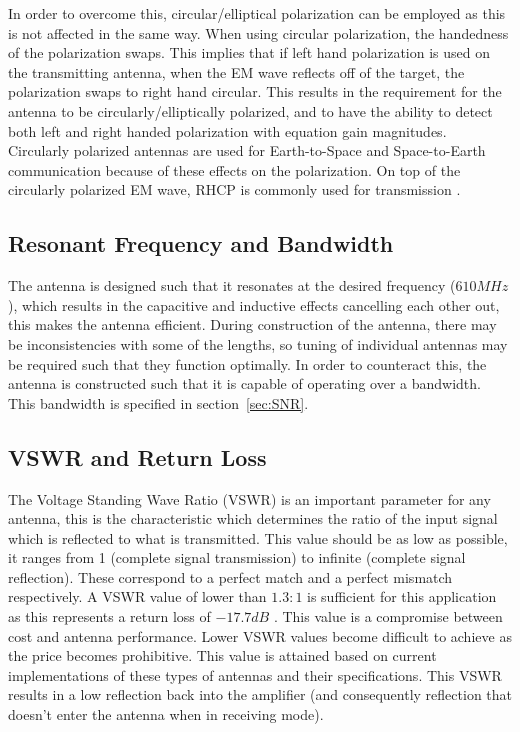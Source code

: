\documentclass[11pt]{witseiepaper}
\begin{document}
In order to overcome this, circular/elliptical polarization can be employed as this is not affected in the same way.
When using circular polarization, the handedness of the polarization swaps. This implies that if left hand polarization is used on the transmitting antenna, when the EM wave reflects off of the target, the polarization swaps to right hand circular.
This results in the requirement for the antenna to be circularly/elliptically polarized, and to have the ability to detect both left and right handed polarization with equation gain magnitudes.
Circularly polarized antennas are used for Earth-to-Space and Space-to-Earth communication because of these effects on the polarization. On top of the circularly polarized EM wave, RHCP is commonly used for transmission \cite[p.~31]{crossedDipoleDesign}.


\subsection{Resonant Frequency and Bandwidth} \label{sec:ResonantFrequencyandBandwidth}
The antenna is designed such that it resonates at the desired frequency ($610 MHz$), which results in the capacitive and inductive effects cancelling each other out, this makes the antenna efficient. During construction of the antenna, there may be inconsistencies with some of the lengths, so tuning of individual antennas may be required such that they function optimally. In order to counteract this, the antenna is constructed such that it is capable of operating over a bandwidth. This bandwidth is specified in section~\ref{sec:SNR}.


\subsection{VSWR and Return Loss} \label{sec:VSRWandReturnLoss}
The Voltage Standing Wave Ratio (VSWR) is an important parameter for any antenna, this is the characteristic which determines the ratio of the input signal which is reflected to what is transmitted. This value should be as low as possible, it ranges from 1 (complete signal transmission) to infinite (complete signal reflection). These correspond to a perfect match and a perfect mismatch respectively.
A VSWR value of lower than $1.3:1$ is sufficient for this application as this represents a return loss of $-17.7 dB$ \cite{AntennaPrice1,AntennaPrice2,AntennaPrice3,AntennaPrice4}. This value is a compromise between cost and antenna performance. Lower VSWR values become difficult to achieve as the price becomes prohibitive. This value is attained based on current implementations of these types of antennas and their specifications.
This VSWR results in a low reflection back into the amplifier (and consequently reflection that doesn't enter the antenna when in receiving mode).
\end{document}
